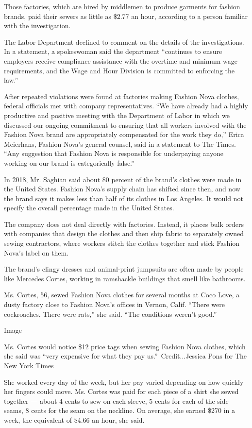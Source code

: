Those factories, which are hired by middlemen to produce garments for
fashion brands, paid their sewers as little as \$2.77 an hour, according
to a person familiar with the investigation.

The Labor Department declined to comment on the details of the
investigations. In a statement, a spokeswoman said the department
``continues to ensure employers receive compliance assistance with the
overtime and minimum wage requirements, and the Wage and Hour Division
is committed to enforcing the law.''

After repeated violations were found at factories making Fashion Nova
clothes, federal officials met with company representatives. ``We have
already had a highly productive and positive meeting with the Department
of Labor in which we discussed our ongoing commitment to ensuring that
all workers involved with the Fashion Nova brand are appropriately
compensated for the work they do,'' Erica Meierhans, Fashion Nova's
general counsel, said in a statement to The Times. ``Any suggestion that
Fashion Nova is responsible for underpaying anyone working on our brand
is categorically false.''

In 2018, Mr. Saghian said about 80 percent of the brand's clothes were
made in the United States. Fashion Nova's supply chain has shifted since
then, and now the brand says it makes less than half of its clothes in
Los Angeles. It would not specify the overall percentage made in the
United States.

The company does not deal directly with factories. Instead, it places
bulk orders with companies that design the clothes and then ship fabric
to separately owned sewing contractors, where workers stitch the clothes
together and stick Fashion Nova's label on them.

The brand's clingy dresses and animal-print jumpsuits are often made by
people like Mercedes Cortes, working in ramshackle buildings that smell
like bathrooms.

Ms. Cortes, 56, sewed Fashion Nova clothes for several months at Coco
Love, a dusty factory close to Fashion Nova's offices in Vernon, Calif.
``There were cockroaches. There were rats,'' she said. ``The conditions
weren't good.''

Image

Ms. Cortes would notice \$12 price tags when sewing Fashion Nova
clothes, which she said was ``very expensive for what they pay
us.''~Credit...Jessica Pons for The New York Times

She worked every day of the week, but her pay varied depending on how
quickly her fingers could move. Ms. Cortes was paid for each piece of a
shirt she sewed together --- about 4 cents to sew on each sleeve, 5
cents for each of the side seams, 8 cents for the seam on the neckline.
On average, she earned \$270 in a week, the equivalent of \$4.66 an
hour, she said.

